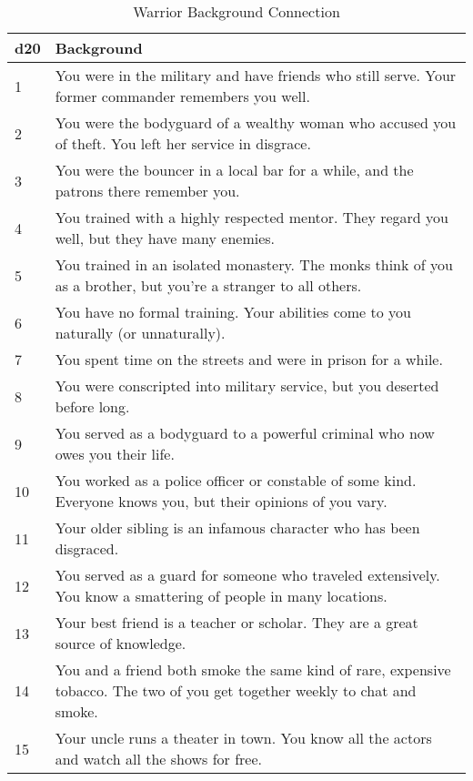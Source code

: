 \begin{table*}
\centering

\caption{Warrior Background Connection}
\label{tab:Warrior Background Connection}

\begin{tabularx}{\textwidth}{| p{} | p{} |}
\hline
\textbf{d20} & \textbf{Background} \\
\hline
1 & You were in the military and have friends who still serve. Your former commander remembers you well.\\ \hline
2 & You were the bodyguard of a wealthy woman who accused you of theft. You left her service in disgrace.  \\ \hline
3 & You were the bouncer in a local bar for a while, and the patrons there remember you.  \\ \hline
4 & You trained with a highly respected mentor. They regard you well, but they have many enemies.  \\ \hline
5 & You trained in an isolated monastery. The monks think of you as a brother, but you’re a stranger to all others.  \\ \hline
6 & You have no formal training. Your abilities come to you naturally (or unnaturally).  \\ \hline
7 & You spent time on the streets and were in prison for a while. \\ \hline
8 & You were conscripted into military service, but you deserted before long.  \\ \hline
9 & You served as a bodyguard to a powerful criminal who now owes you their life.  \\ \hline
10 & You worked as a police officer or constable of some kind. Everyone knows you, but their opinions of you vary.  \\ \hline
11 & Your older sibling is an infamous character who has been disgraced. \\ \hline
12 & You served as a guard for someone who traveled extensively. You know a smattering of people in many locations. \\ \hline
13 & Your best friend is a teacher or scholar. They are a great source of knowledge. \\ \hline
14 & You and a friend both smoke the same kind of rare, expensive tobacco. The two of you get together weekly to chat and smoke. \\ \hline
15 & Your uncle runs a theater in town. You know all the actors and watch all the shows for free. \\ \hline

\end{tabularx}
\end{table*}
